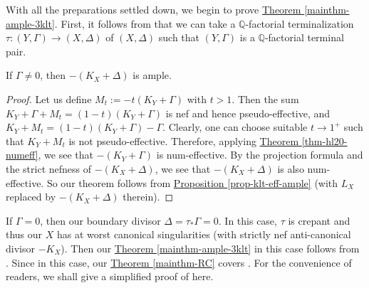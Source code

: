 \noindent
With all the preparations settled down, 
we begin to prove \hyperref[mainthm-ample-3klt]{Theorem \ref*{mainthm-ample-3klt}}.
First, it follows from \cite[Corollary 1.4.3]{BCHM10} that
we can take a $\mathbb{Q}$-factorial terminalization $\tau:(Y,\Gamma)\to (X,\Delta)$ of $(X,\Delta)$ such that $(Y,\Gamma)$ is a $\mathbb{Q}$-factorial terminal pair. 


\begin{thm}\label{thm-case-gammaneq0}
If $\Gamma\neq 0$, then $-(K_X+\Delta)$ is ample.
\end{thm}
\begin{proof}
Let us define $M_t:=-t(K_Y+\Gamma)$ with $t>1$.
Then the sum $K_Y+\Gamma+M_t=(1-t)(K_Y+\Gamma)$ is nef and hence pseudo-effective, and $K_Y+M_t=(1-t)(K_Y+\Gamma)-\Gamma$.
Clearly, one can choose suitable $t\rightarrow 1^+$ such that $K_Y+M_t$ is not pseudo-effective.
Therefore, applying {\hyperref[thm-hl20-numeff]{Theorem  \ref*{thm-hl20-numeff}}}, we see that $-(K_Y+\Gamma)$ is num-effective.
By the projection formula and the strict nefness of $-(K_X+\Delta)$, we see that $-(K_X+\Delta)$ is also num-effective. 
So our theorem follows from {\hyperref[prop-klt-eff-ample]{Proposition  \ref*{prop-klt-eff-ample}}} (with $L_X$ replaced by $-(K_X+\Delta)$ therein).
\end{proof}

\begin{rmq}\label{rmq-case-gamma=0}
If $\Gamma=0$, then our boundary divisor $\Delta=\tau_*\Gamma=0$.
In this case, $\tau$ is  crepant and thus our $X$ has at worst canonical singularities (with strictly nef anti-canonical divisor $-K_X$).
Then  our \texorpdfstring{{\hyperref[mainthm-ample-3klt]{Theorem \ref*{mainthm-ample-3klt}}}}{text} in this case follows from \cite[Main Theorem]{Ueh00}. 
Since in this case, our \texorpdfstring{{\hyperref[mainthm-RC]{Theorem \ref*{mainthm-RC}}}}{text} covers \cite[Remark 3.8]{Ueh00}.
For the convenience of readers, we shall give a simplified proof of \cite{Ueh00} here.
\end{rmq}


